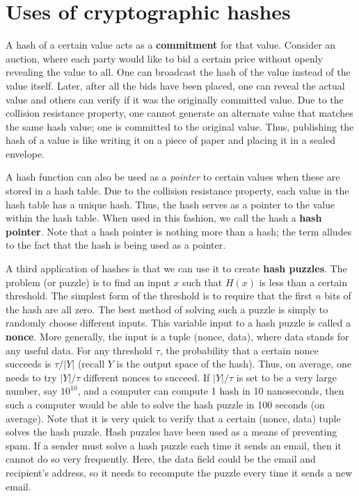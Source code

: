 \documentclass{article}
\begin{document}
\section*{Uses of cryptographic hashes}
A hash of a certain value acts as a \textbf{commitment} for that value. Consider an auction, where each party would like to bid a certain price without openly revealing the value to all. One can broadcast the hash of the value instead of the value itself. Later, after all the bids have been placed, one can reveal the actual value and others can verify if it was the originally committed value. Due to the collision resistance property, one cannot generate an alternate value that matches the same hash value; one is committed to the original value. Thus, publishing the hash of a value is like writing it on a piece of paper and placing it in a sealed envelope.

A hash function can also be used as a \textit{pointer} to certain values when these are stored in a hash table. Due to the collision resistance property, each value in the hash table has a unique hash. Thus, the hash serves as a pointer to the value within the hash table. When used in this fashion, we call the hash a \textbf{hash pointer}. Note that a hash pointer is nothing more than a hash; the term alludes to the fact that the hash is being used as a pointer.

A third application of hashes is that we can use it to create \textbf{hash puzzles}. The problem (or puzzle) is to find an input $x$ such that $H(x)$ is less than a certain threshold. The simplest form of the threshold is to require that the first $n$ bits of the hash are all zero. The best method of solving such a puzzle is simply to randomly choose different inputs. This variable input to a hash puzzle is called a \textbf{nonce}. More generally, the input is a tuple (nonce, data), where data stands for any useful data. For any threshold $\tau$, the probability that a certain nonce succeeds is $\tau/|Y|$ (recall $Y$ is the output space of the hash). Thus, on average, one needs to try $|Y|/\tau$ different nonces to succeed. If $|Y|/\tau$ is set to be a very large number, say $10^{10}$, and a computer can compute 1 hash in 10 nanoseconds, then such a computer would be able to solve the hash puzzle in 100 seconds (on average). Note that it is very quick to verify that a certain (nonce, data) tuple solves the hash puzzle.  Hash puzzles have been used as a means of preventing spam. If a sender must solve a hash puzzle each time it sends an email, then it cannot do so very frequently. Here, the data field could be the email and recipient’s address, so it needs to recompute the puzzle every time it sends a new email.
\end{document}
